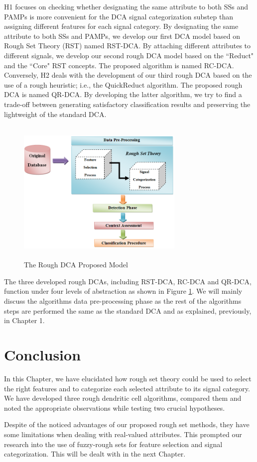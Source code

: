 H1 focuses on checking whether designating the same attribute to both SSs and PAMPs is more convenient for the DCA signal categorization substep than assigning different features for each signal category. By designating the same attribute to both SSs and PAMPs, we develop our first  DCA model based on Rough Set Theory (RST) named RST-DCA. By attaching different attributes to different signals, we develop our second rough DCA model   based on the  ``Reduct" and the ``Core" RST concepts. The proposed algorithm is  named RC-DCA. Conversely, H2 deals with the development of our third rough DCA    based on the use of a rough heuristic; i.e.,  the QuickReduct algorithm. The proposed rough DCA   is named QR-DCA. By developing the latter algorithm, we try to find a trade-off between generating satisfactory classification results and preserving the lightweight of the standard DCA.
\begin{figure}[!h]
\begin{center}
\includegraphics[width=8cm,height=7cm]{RSTModel}
\caption{The Rough DCA Proposed Model}\label{steps}
\end{center}
\end{figure}

The three developed rough DCAs, including  RST-DCA, RC-DCA and QR-DCA,  function under four levels of abstraction as shown in Figure \ref{steps}. We will mainly discuss the algorithms data pre-processing phase  as the rest of the algorithms steps are performed the same as the standard DCA and as explained, previously, in Chapter 1.

\section{Conclusion}
In this Chapter, we have elucidated  how rough set theory could be used to select the right features  and to categorize each selected attribute to its signal category. We have developed three rough dendritic cell algorithms, compared them and noted the appropriate observations while testing two crucial hypotheses. 

Despite of the noticed advantages of our proposed rough set methods, they have some limitations when dealing with real-valued attributes. This prompted our research into the use of fuzzy-rough sets for feature selection and signal categorization. This will be dealt with in the next Chapter.
